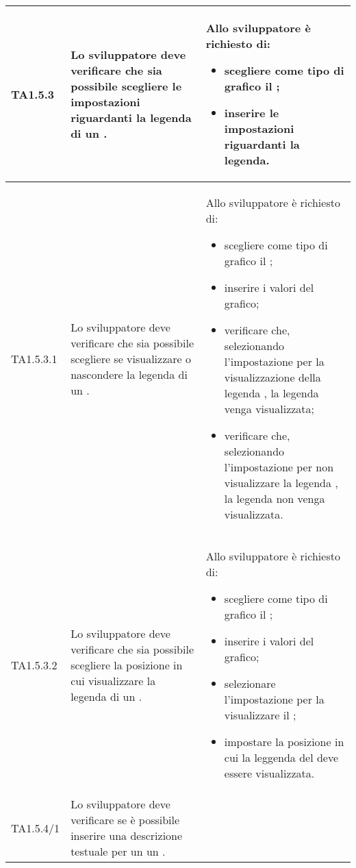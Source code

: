 \begin{longtabu}{| X[0.5] | X | X |}
	TA1.5.3 & Lo sviluppatore deve verificare che sia possibile scegliere le impostazioni riguardanti la legenda di un .

		& Allo sviluppatore è richiesto di:
		\begin{itemize}
			\item scegliere come tipo di grafico il ;
			\item inserire le impostazioni riguardanti la legenda.
		\end{itemize}
\\ \hline

	TA1.5.3.1 & Lo sviluppatore deve verificare che sia possibile scegliere se visualizzare o nascondere la legenda di un .
			
		& Allo sviluppatore è richiesto di:
		\begin{itemize}
			\item scegliere come tipo di grafico il ;
			\item inserire i valori del grafico;
			\item verificare che, selezionando l'impostazione per la visualizzazione della legenda , la legenda venga visualizzata;
			\item verificare che, selezionando l'impostazione per non visualizzare la legenda , la legenda non venga visualizzata.
		\end{itemize}
\\ \hline

	TA1.5.3.2 & Lo sviluppatore deve verificare che sia possibile scegliere la posizione in cui visualizzare la legenda di un .
			
		& Allo sviluppatore è richiesto di:
		\begin{itemize}
			\item scegliere come tipo di grafico il ;
			\item inserire i valori del grafico;
			\item selezionare l'impostazione per la visualizzare il ;
			\item impostare la posizione in cui la leggenda del  deve essere visualizzata.
		\end{itemize}
\\ \hline

	TA1.5.4/1 & Lo sviluppatore deve verificare se è possibile inserire una descrizione testuale per un un .


\end{longtabu}
